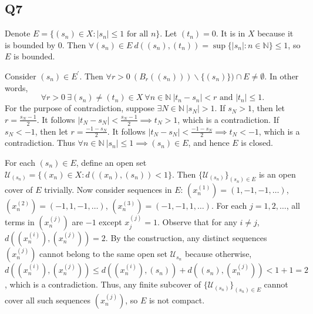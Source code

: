\documentclass[12pt,lettersize]{article}
\newcommand{\N}{\mathbb{N}}
\newcommand{\U}{\mathcal{U}}
\begin{document}
	\subsection*{Q7}
	Denote $E=\{(s_n)\in X: |s_n|\leq 1\text{ for all $n$}\}$. Let $(t_n)=0$. It is in $X$ because it is bounded by $0$. Then $\forall (s_n)\in E\ d((s_n),(t_n))=\sup\{|s_n|: n\in\N\}\leq 1$, so $E$ is bounded.\smallskip
	
	Consider $(s_n)\in E^\prime$. Then $\forall r>0\ (B_r((s_n)))\backslash\{(s_n)\})\cap E\neq\emptyset$. In other words, 
	\begin{displaymath}
		\forall r>0\ \exists(s_n)\neq(t_n)\in X\ \forall n\in\N\ |t_n-s_n|<r\text{ and }|t_n|\leq 1.
	\end{displaymath}
	For the purpose of contradiction, suppose $\exists N\in\N\ |s_N|>1$. If $s_N>1$, then let $r=\frac{s_{N}-1}{2}$. It follows $|t_N-s_N|<\frac{s_N-1}{2}\implies t_N>1$, which is a contradiction. If $s_N<-1$, then let $r=\frac{-1-s_N}{2}$. It follows $|t_N-s_N|<\frac{-1-s_N}{2}\implies t_N<-1$, which is a contradiction. Thus $\forall n\in\N\ |s_n|\leq1\implies (s_n)\in E$, and hence $E$ is closed.\smallskip
	
	For each $(s_n)\in E$, define an open set $\U_{(s_n)}=\{(x_n)\in X: d((x_n),(s_n))<1\}$. Then $\{\U_{(s_n)}\}_{(s_n)\in E}$ is an open cover of $E$ trivially. Now consider sequences in $E$: $(x_n^{(1)})=(1,-1,-1,\dots)$, $(x_n^{(2)})=(-1,1,-1,\dots)$, $(x_n^{(3)})=(-1,-1,1,\dots)$. For each $j=1,2,\dots$, all terms in $(x_n^{(j)})$ are $-1$ except $x_j^{(j)}=1$. Observe that for any $i\neq j$, $d((x_n^{(i)}),(x_n^{(j)}))=2$. By the construction, any distinct sequences $(x_n^{(j)})$ cannot belong to the same open set $\U_{s_n}$ because otherwise, $d((x_n^{(i)}),(x_n^{(j)}))\leq d((x_n^{(i)}),(s_n))+d((s_n),(x_n^{(j)}))<1+1=2$, which is a contradiction. Thus, any finite subcover of $\{\U_{(s_n)}\}_{(s_n)\in E}$ cannot cover all such sequences $(x_n^{(j)})$, so $E$ is not compact.
	
\end{document}
